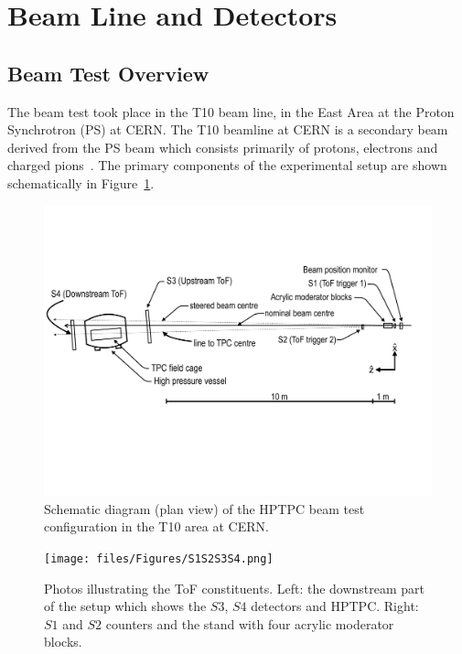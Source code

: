 \section{Beam Line and Detectors}
\label{hptpcPaper:sec:Methods}

\subsection{Beam Test Overview}
The beam test took place in the T10 beam line, in the East Area at the Proton Synchrotron (PS) at CERN.
The T10 beamline at CERN is a secondary beam derived from the PS beam which consists primarily of protons, electrons and charged pions~\cite{T10Report}.
The primary components of the experimental setup are shown schematically in Figure~\ref{fig:setup}.

\begin{figure}
  \includegraphics[width=1.0\linewidth]{files/Figures/hptpc_t10_planview.pdf}
  \caption{Schematic diagram (plan view) of the HPTPC beam test configuration in the T10 area at CERN.}
  \label{fig:setup}
\end{figure}
\begin{figure}
  \centering
  \texttt{[image: files/Figures/S1S2S3S4.png]}
  \caption{Photos illustrating the ToF constituents. Left: the downstream part of the setup which shows the $\mathit{S3}$, $\mathit{S4}$ detectors and HPTPC. Right: $\mathit{S1}$ and $\mathit{S2}$ counters and the stand with four acrylic moderator blocks.}
  \label{fig:modblocks}
\end{figure}

